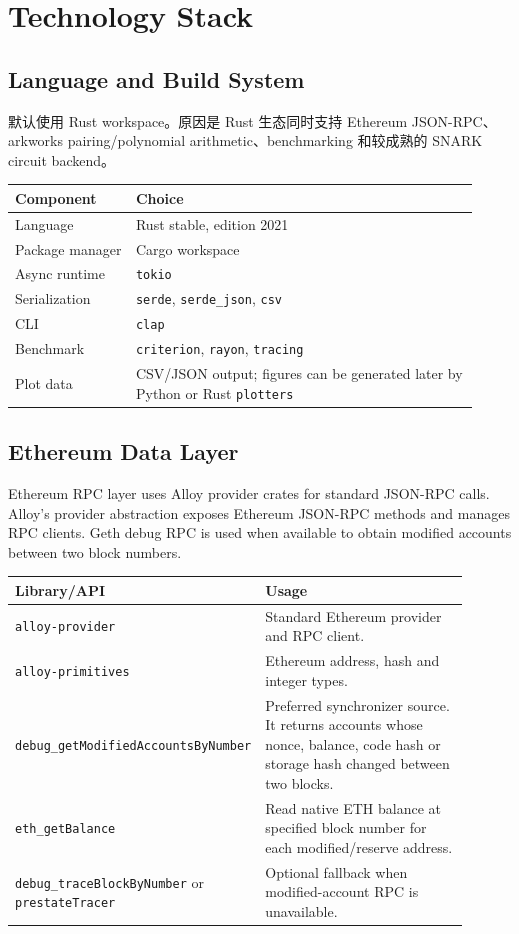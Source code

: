 \documentclass[UTF8,a4paper,11pt]{ctexart}
\begin{document}
\section{Technology Stack}

\subsection{Language and Build System}

默认使用 Rust workspace。原因是 Rust 生态同时支持 Ethereum JSON-RPC、arkworks pairing/polynomial arithmetic、benchmarking 和较成熟的 SNARK circuit backend。

\begin{longtable}{p{0.24\linewidth}p{0.68\linewidth}}
\toprule
Component & Choice \\
\midrule
Language & Rust stable, edition 2021 \\
Package manager & Cargo workspace \\
Async runtime & \texttt{tokio} \\
Serialization & \texttt{serde}, \texttt{serde\_json}, \texttt{csv} \\
CLI & \texttt{clap} \\
Benchmark & \texttt{criterion}, \texttt{rayon}, \texttt{tracing} \\
Plot data & CSV/JSON output; figures can be generated later by Python or Rust \texttt{plotters} \\
\bottomrule
\end{longtable}

\subsection{Ethereum Data Layer}

Ethereum RPC layer uses Alloy provider crates for standard JSON-RPC calls. Alloy's provider abstraction exposes Ethereum JSON-RPC methods and manages RPC clients. Geth debug RPC is used when available to obtain modified accounts between two block numbers.

\begin{longtable}{p{0.25\linewidth}p{0.65\linewidth}}
\toprule
Library/API & Usage \\
\midrule
\texttt{alloy-provider} & Standard Ethereum provider and RPC client. \\
\texttt{alloy-primitives} & Ethereum address, hash and integer types. \\
\texttt{debug\_getModifiedAccountsByNumber} & Preferred synchronizer source. It returns accounts whose nonce, balance, code hash or storage hash changed between two blocks. \\
\texttt{eth\_getBalance} & Read native ETH balance at specified block number for each modified/reserve address. \\
\texttt{debug\_traceBlockByNumber} or \texttt{prestateTracer} & Optional fallback when modified-account RPC is unavailable. \\
\bottomrule
\end{longtable}
\end{document}
